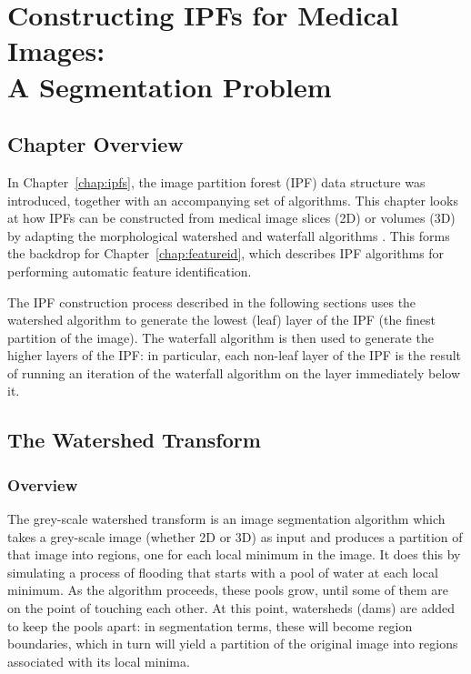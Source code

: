 \chapter[Constructing IPFs for Medical Images: A Segmentation Problem]{Constructing IPFs for Medical Images:\\A Segmentation Problem}

\section{Chapter Overview}

In Chapter~\ref{chap:ipfs}, the image partition forest (IPF) data structure was introduced, together with an accompanying set of algorithms. This chapter looks at how IPFs can be constructed from medical image slices (2D) or volumes (3D) by adapting the morphological watershed and waterfall algorithms \cite{beucher94,marcotegui05}. This forms the backdrop for Chapter~\ref{chap:featureid}, which describes IPF algorithms for performing automatic feature identification.

The IPF construction process described in the following sections uses the watershed algorithm to generate the lowest (leaf) layer of the IPF (the finest partition of the image). The waterfall algorithm is then used to generate the higher layers of the IPF: in particular, each non-leaf layer of the IPF is the result of running an iteration of the waterfall algorithm on the layer immediately below it.

\section{The Watershed Transform}

\subsection{Overview}

The grey-scale watershed transform is an image segmentation algorithm which takes a grey-scale image (whether 2D or 3D) as input and produces a partition of that image into regions, one for each local minimum in the image. It does this by simulating a process of flooding that starts with a pool of water at each local minimum. As the algorithm proceeds, these pools grow, until some of them are on the point of touching each other. At this point, watersheds (dams) are added to keep the pools apart: in segmentation terms, these will become region boundaries, which in turn will yield a partition of the original image into regions associated with its local minima.

